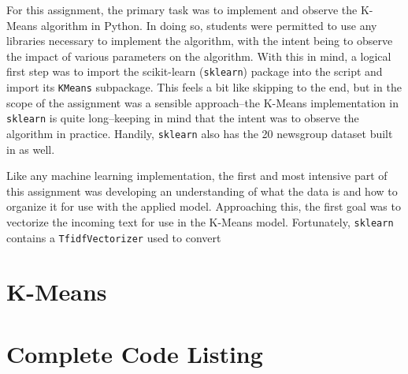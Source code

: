 \documentclass[11pt]{article}
\begin{document}
  
  \graphicspath{{./images/}}
\newpage
For this assignment, the primary task was to implement and observe the K-Means algorithm in Python.
In doing so, students were permitted to use any libraries necessary to implement the algorithm, with the intent being to observe the impact of various parameters on the algorithm.
With this in mind, a logical first step was to import the scikit-learn (\lstinline{sklearn}) package into the script and import its \lstinline{KMeans} subpackage.
This feels a bit like skipping to the end, but in the scope of the assignment was a sensible approach--the K-Means implementation in \lstinline{sklearn} is quite long--keeping in mind that the intent was to observe the algorithm in practice.
Handily, \lstinline{sklearn} also has the 20 newsgroup dataset built in as well.

Like any machine learning implementation, the first and most intensive part of this assignment was developing an understanding of what the data is and how to organize it for use with the applied model.
Approaching this, the first goal was to vectorize the incoming text for use in the K-Means model.
Fortunately, \lstinline{sklearn} contains a \lstinline{TfidfVectorizer} used to convert 

\newpage
\begin{appendices}
\section{K-Means} \label{outputs}
\newpage
\section{Complete Code Listing} \label{codelist}


\end{appendices}
  
\end{document}
